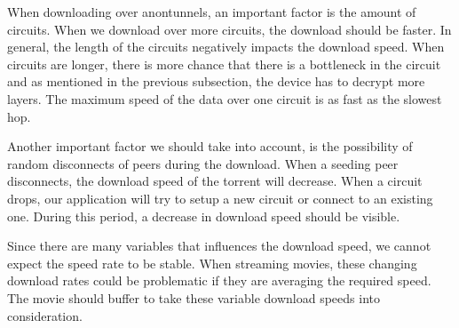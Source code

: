 		When downloading over anontunnels, an important factor is the amount of circuits. When we download over more circuits, the download should be faster. In general, the length of the circuits negatively impacts the download speed. When circuits are longer, there is more chance that there is a bottleneck in the circuit and as mentioned in the previous subsection, the device has to decrypt more layers. The maximum speed of the data over one circuit is as fast as the slowest hop.
		
		Another important factor we should take into account, is the possibility of random disconnects of peers during the download. When a seeding peer disconnects, the download speed of the torrent will decrease. When a circuit drops, our application will try to setup a new circuit or connect to an existing one. During this period, a decrease in download speed should be visible.
		
		Since there are many variables that influences the download speed, we cannot expect the speed rate to be stable. When streaming movies, these changing download rates could be problematic if they are averaging the required speed. The movie should buffer to take these variable download speeds into consideration.